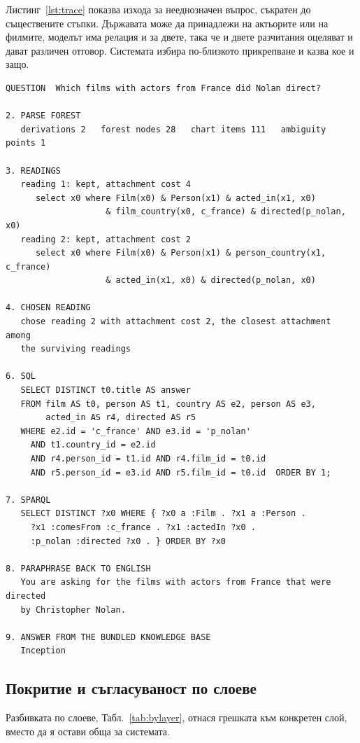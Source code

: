 Листинг~\ref{lst:trace} показва изхода за нееднозначен въпрос, съкратен до съществените
стъпки. Държавата може да принадлежи на актьорите или на филмите, моделът има релация и за
двете, така че и двете разчитания оцеляват и дават различен отговор. Системата избира
по-близкото прикрепване и казва кое и защо.

\begin{lstlisting}[language={},numbers=none,basicstyle=\scriptsize\ttfamily,
caption={Съкратен изход на \code{lexicon} за нееднозначен въпрос},label={lst:trace}]
QUESTION  Which films with actors from France did Nolan direct?

2. PARSE FOREST
   derivations 2   forest nodes 28   chart items 111   ambiguity points 1

3. READINGS
   reading 1: kept, attachment cost 4
      select x0 where Film(x0) & Person(x1) & acted_in(x1, x0)
                    & film_country(x0, c_france) & directed(p_nolan, x0)
   reading 2: kept, attachment cost 2
      select x0 where Film(x0) & Person(x1) & person_country(x1, c_france)
                    & acted_in(x1, x0) & directed(p_nolan, x0)

4. CHOSEN READING
   chose reading 2 with attachment cost 2, the closest attachment among
   the surviving readings

6. SQL
   SELECT DISTINCT t0.title AS answer
   FROM film AS t0, person AS t1, country AS e2, person AS e3,
        acted_in AS r4, directed AS r5
   WHERE e2.id = 'c_france' AND e3.id = 'p_nolan'
     AND t1.country_id = e2.id
     AND r4.person_id = t1.id AND r4.film_id = t0.id
     AND r5.person_id = e3.id AND r5.film_id = t0.id  ORDER BY 1;

7. SPARQL
   SELECT DISTINCT ?x0 WHERE { ?x0 a :Film . ?x1 a :Person .
     ?x1 :comesFrom :c_france . ?x1 :actedIn ?x0 .
     :p_nolan :directed ?x0 . } ORDER BY ?x0

8. PARAPHRASE BACK TO ENGLISH
   You are asking for the films with actors from France that were directed
   by Christopher Nolan.

9. ANSWER FROM THE BUNDLED KNOWLEDGE BASE
   Inception
\end{lstlisting}

\subsection{Покритие и съгласуваност по слоеве}

Разбивката по слоеве, Табл.~\ref{tab:bylayer}, отнася грешката към конкретен слой, вместо
да я остави обща за системата.

